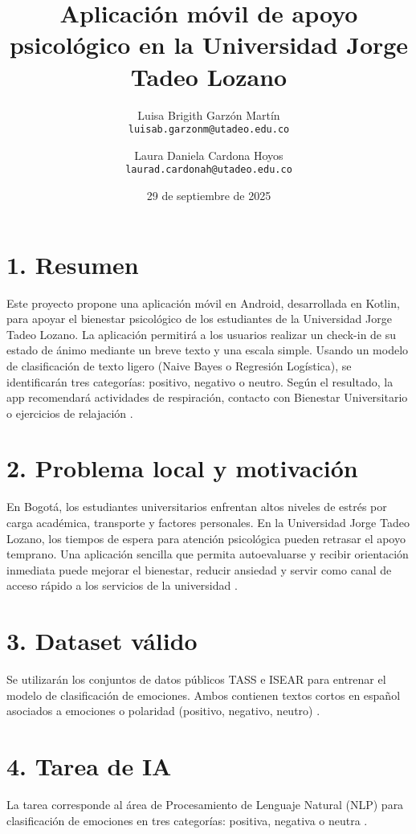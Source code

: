 \documentclass[11pt,letterpaper]{article}
\title{Aplicación móvil de apoyo psicológico en la Universidad Jorge Tadeo Lozano}
\author{
Luisa Brigith Garzón Martín \\ \texttt{luisab.garzonm@utadeo.edu.co} 
\and 
Laura Daniela Cardona Hoyos \\ \texttt{laurad.cardonah@utadeo.edu.co}
}
\date{29 de septiembre de 2025}
\begin{document}
\maketitle

\section*{1. Resumen}
Este proyecto propone una aplicación móvil en Android, desarrollada en Kotlin, para apoyar el bienestar psicológico de los estudiantes de la Universidad Jorge Tadeo Lozano. La aplicación permitirá a los usuarios realizar un check-in de su estado de ánimo mediante un breve texto y una escala simple. Usando un modelo de clasificación de texto ligero (Naive Bayes o Regresión Logística), se identificarán tres categorías: positivo, negativo o neutro. Según el resultado, la app recomendará actividades de respiración, contacto con Bienestar Universitario o ejercicios de relajación \cite{garcia2020appsalud,who2022mental}.

\section*{2. Problema local y motivación}
En Bogotá, los estudiantes universitarios enfrentan altos niveles de estrés por carga académica, transporte y factores personales. En la Universidad Jorge Tadeo Lozano, los tiempos de espera para atención psicológica pueden retrasar el apoyo temprano. Una aplicación sencilla que permita autoevaluarse y recibir orientación inmediata puede mejorar el bienestar, reducir ansiedad y servir como canal de acceso rápido a los servicios de la universidad \cite{utadeo2024bienestar}.

\section*{3. Dataset válido}
Se utilizarán los conjuntos de datos públicos TASS e ISEAR para entrenar el modelo de clasificación de emociones. Ambos contienen textos cortos en español asociados a emociones o polaridad (positivo, negativo, neutro) \cite{scherer1986isear,villena2013tass}.

\section*{4. Tarea de IA}
La tarea corresponde al área de Procesamiento de Lenguaje Natural (NLP) para clasificación de emociones en tres categorías: positiva, negativa o neutra \cite{manning2008introduction}.
\end{document}
